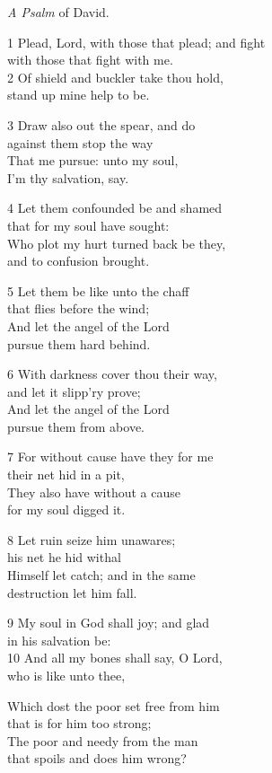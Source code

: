 \emph{A Psalm} of David.

1 Plead, Lord, with those that plead; and fight\\
with those that fight with me.\\
2 Of shield and buckler take thou hold,\\
stand up mine help to be.

3 Draw also out the spear, and do\\
against them stop the way\\
That me pursue: unto my soul,\\
I’m thy salvation, say.

4 Let them confounded be and shamed\\
that for my soul have sought:\\
Who plot my hurt turned back be they,\\
and to confusion brought.

5 Let them be like unto the chaff\\
that flies before the wind;\\
And let the angel of the Lord\\
pursue them hard behind.

6 With darkness cover thou their way,\\
and let it slipp’ry prove;\\
And let the angel of the Lord\\
pursue them from above.

7 For without cause have they for me\\
their net hid in a pit,\\
They also have without a cause\\
for my soul digged it.

8 Let ruin seize him unawares;\\
his net he hid withal\\
Himself let catch; and in the same\\
destruction let him fall.

9 My soul in God shall joy; and glad\\
in his salvation be:\\
10 And all my bones shall say, O Lord,\\
who is like unto thee,

Which dost the poor set free from him\\
that is for him too strong;\\
The poor and needy from the man\\
that spoils and does him wrong?

